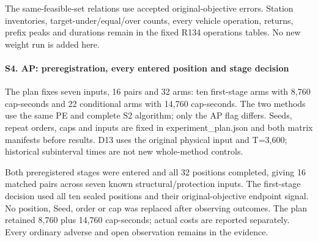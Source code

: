 \documentclass[
  american,
  11pt,
]{article}
\begin{document}
\begin{landscape}
\end{landscape}

The same-feasible-set relations use accepted original-objective errors.
Station inventories, target-under/equal/over counts, every vehicle
operation, returns, prefix peaks and durations remain in the fixed R134
operations tables. No new weight run is added here.

\paragraph{S4. AP: preregistration, every entered position and stage
decision}\label{s4.-ap-preregistration-every-entered-position-and-stage-decision}

The plan fixes seven inputs, 16 pairs and 32 arms: ten first-stage arms
with 8,760 cap-seconds and 22 conditional arms with 14,760 cap-seconds.
The two methods use the same PE and complete S2 algorithm; only the AP
flag differs. Seeds, repeat orders, caps and inputs are fixed in
experiment\_\allowbreak{}plan.json and both matrix manifests before results. D13 uses
the original physical input and T=3,600; historical subinterval times
are not new whole-method controls.

Both preregistered stages were entered and all 32 positions completed,
giving 16 matched pairs across seven known structural/protection inputs.
The first-stage decision used all ten sealed positions and their
original-objective endpoint signal. No position, Seed, order or cap was
replaced after observing outcomes. The plan retained 8,760 plus 14,760
cap-seconds; actual costs are reported separately. Every ordinary
adverse and open observation remains in the evidence.
\end{document}

